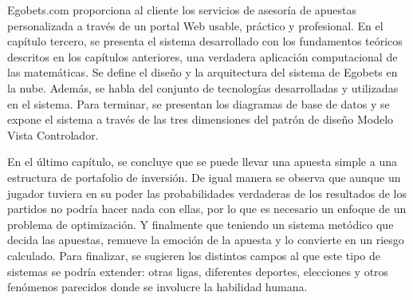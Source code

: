 Egobets.com proporciona al cliente los servicios de asesoría de apuestas personalizada a través de un portal Web usable, práctico y profesional. En el capítulo tercero, se presenta el sistema desarrollado con los fundamentos teóricos descritos en los capítulos anteriores, una verdadera aplicación computacional de las matemáticas. Se define el diseño y la arquitectura del sistema de Egobets en la nube. Además, se habla del conjunto de tecnologías desarrolladas y utilizadas en el sistema. Para terminar, se presentan los diagramas de base de datos y se expone el sistema a través de las tres dimensiones del patrón de diseño Modelo Vista Controlador. 

En el último capítulo, se concluye que se puede llevar una apuesta simple a una estructura de portafolio de inversión. De igual manera se observa que aunque un jugador tuviera en su poder las probabilidades verdaderas de los resultados de los partidos no podría hacer nada con ellas, por lo que es necesario un enfoque de un problema de optimización. Y finalmente que teniendo un sistema metódico que decida las apuestas, remueve la emoción de la apuesta y lo convierte en un riesgo calculado. Para finalizar, se sugieren los distintos campos al que este tipo de sistemas se podría extender: otras ligas, diferentes deportes, elecciones y otros fenómenos parecidos donde se involucre la habilidad humana.


